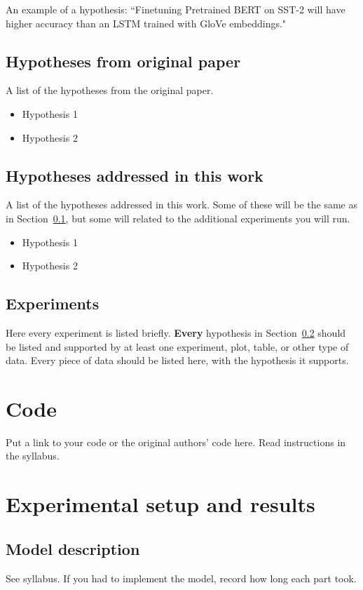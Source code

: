 \documentclass[11pt,a4paper]{article}
\begin{document}
An example of a hypothesis: 
``Finetuning Pretrained BERT on SST-2 will have higher accuracy than an LSTM trained with GloVe embeddings."


\subsection{Hypotheses from original paper}
\label{sec:original_hypotheses}
A list of the hypotheses from the original paper.
\begin{itemize}
    \item Hypothesis 1
    \item Hypothesis 2
\end{itemize}

\subsection{Hypotheses addressed in this work}
\label{sec:current_hypotheses}
A list of the hypotheses addressed in this work. Some of these will be the same as in Section~\ref{sec:original_hypotheses}, but some will related to the additional experiments you will run.


\begin{itemize}
    \item Hypothesis 1
    \item Hypothesis 2
\end{itemize}


\subsection{Experiments}
Here every experiment is listed briefly.
\textbf{Every} hypothesis in Section~\ref{sec:current_hypotheses} should be listed and supported by at least one experiment, plot, table, or other type of data. 
Every piece of data should be listed here, with the hypothesis it supports.

\section{Code}
Put a link to your code or the original authors' code here. Read instructions in the syllabus.

\section{Experimental setup and results}

\subsection{Model description}
See syllabus. If you had to implement the model, record how long each part took.
\end{document}
